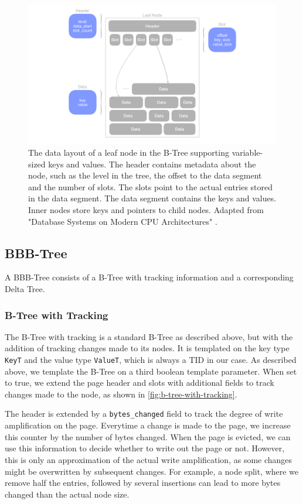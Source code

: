 \begin{figure}[htbp]
  \centering
  \includegraphics[width=1\textwidth]{figures/leaf_node.pdf}
  \caption{The data layout of a leaf node in the B-Tree supporting variable-sized keys and values. The header contains metadata about the node, such as the level in the tree, the offset to the data segment and the number of slots. The slots point to the actual entries stored in the data segment. The data segment contains the keys and values. Inner nodes store keys and pointers to child nodes. Adapted from "Database Systems on Modern CPU Architectures" \autocite{mdbs2024slides}.}
  \label{fig:leaf-node}
\end{figure}

\subsection*{BBB-Tree}

A BBB-Tree consists of a B-Tree with tracking information and a corresponding Delta Tree.

\subsubsection*{B-Tree with Tracking}
The B-Tree with tracking is a standard B-Tree as described above, but with the addition of tracking changes made to its nodes.
It is templated on the key type \texttt{KeyT} and the value type \texttt{ValueT}, which is always a \ac{TID} in our case.
As described above, we template the B-Tree on a third boolean template parameter.
When set to true, we extend the page header and slots with additional fields to track changes made to the node, as shown in \autoref{fig:b-tree-with-tracking}.

The header is extended by a \texttt{bytes\_changed} field to track the degree of write amplification on the page.
Everytime a change is made to the page, we increase this counter by the number of bytes changed.
When the page is evicted, we can use this information to decide whether to write out the page or not.
However, this is only an approximation of the actual write amplification, as some changes might be overwritten by subsequent changes.
For example, a node split, where we remove half the entries, followed by several insertions can lead to more bytes changed than the actual node size.


